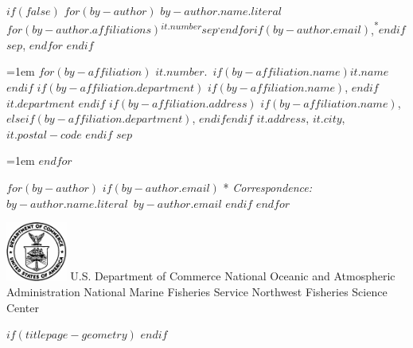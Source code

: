 \begin{minipage}[b][\textheight][s]{\textwidth}
$if(false)$
  $for(by-author)$
    {$by-author.name.literal$}$for(by-author.affiliations)${\textsuperscript{$it.number$}}$sep${\textsuperscript{,}}$endfor$$if(by-author.email)$,{\textsuperscript{*}}$endif$$sep$,
$endfor$
$endif$

\vspace{2\baselineskip}

\hangindent=1em
$for(by-affiliation)$%
{$it.number$}.~$if(by-affiliation.name)${$it.name$}$endif$%
$if(by-affiliation.department)$%
$if(by-affiliation.name)$, $endif$%
{$it.department$}%
$endif$%
$if(by-affiliation.address)$%
$if(by-affiliation.name)$, $else$$if(by-affiliation.department)$, $endif$$endif$%
{$it.address$, $it.city$, $it.postal-code$}%
$endif$%
$sep$\par\hangindent=1em%
$endfor$

\vspace{1\baselineskip}

$for(by-author)$
$if(by-author.email)$
* \textit{Correspondence:}~$by-author.name.literal$~$by-author.email$
$endif$
$endfor$


\vfill


\vspace{1\baselineskip}

\includegraphics[alt={},width=2cm]{support_files/us_doc_logo.png}\newline %
U.S. Department of Commerce\newline
National Oceanic and Atmospheric Administration\newline
National Marine Fisheries Service\newline
Northwest Fisheries Science Center\newline

\end{minipage}
$if(titlepage-geometry)$
\restoregeometry
$endif$
